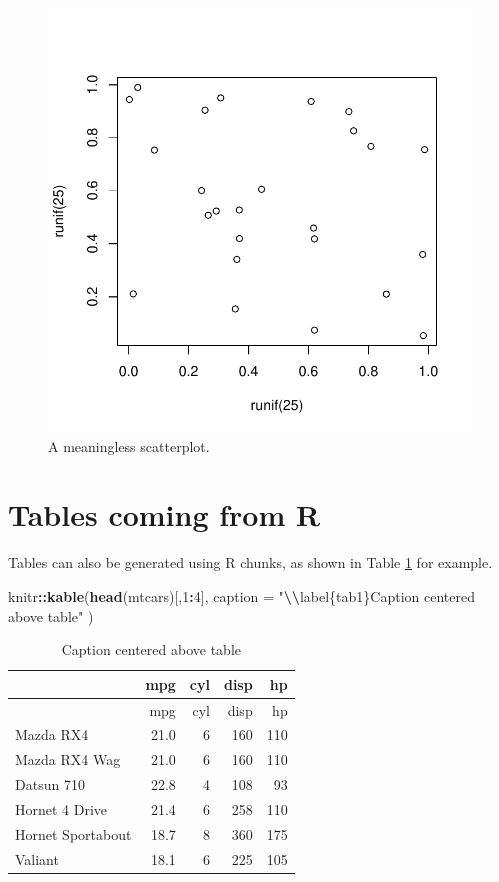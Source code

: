 \documentclass[preprint, 3p,
authoryear]{elsarticle} %
\newenvironment{Shaded}{\begin{snugshade}}{\end{snugshade}}
\newcommand{\AttributeTok}[1]{\textcolor[rgb]{0.13,0.29,0.53}{#1}}
\newcommand{\DecValTok}[1]{\textcolor[rgb]{0.00,0.00,0.81}{#1}}
\newcommand{\FunctionTok}[1]{\textcolor[rgb]{0.13,0.29,0.53}{\textbf{#1}}}
\newcommand{\NormalTok}[1]{#1}
\newcommand{\SpecialCharTok}[1]{\textcolor[rgb]{0.81,0.36,0.00}{\textbf{#1}}}
\newcommand{\StringTok}[1]{\textcolor[rgb]{0.31,0.60,0.02}{#1}}
\begin{document}
\begin{figure}

{\centering \includegraphics[width=0.5\linewidth]{Manuscript_CRKP_files/figure-latex/fig2-1} 

}

\caption{\label{fig2}A meaningless scatterplot.}\label{fig:fig2}
\end{figure}

\section{Tables coming from R}\label{tables-coming-from-r}

Tables can also be generated using R chunks, as shown in Table
\ref{tab1} for example.

\begin{Shaded}
\begin{Highlighting}[]
\NormalTok{knitr}\SpecialCharTok{::}\FunctionTok{kable}\NormalTok{(}\FunctionTok{head}\NormalTok{(mtcars)[,}\DecValTok{1}\SpecialCharTok{:}\DecValTok{4}\NormalTok{], }
    \AttributeTok{caption =} \StringTok{"}\SpecialCharTok{\textbackslash{}\textbackslash{}}\StringTok{label\{tab1\}Caption centered above table"}
\NormalTok{)}
\end{Highlighting}
\end{Shaded}

\begin{longtable}[]{@{}lrrrr@{}}
\caption{\label{tab1}Caption centered above table}\tabularnewline
\toprule\noalign{}
& mpg & cyl & disp & hp \\
\midrule\noalign{}
\endfirsthead
\toprule\noalign{}
& mpg & cyl & disp & hp \\
\midrule\noalign{}
\endhead
\bottomrule\noalign{}
\endlastfoot
Mazda RX4 & 21.0 & 6 & 160 & 110 \\
Mazda RX4 Wag & 21.0 & 6 & 160 & 110 \\
Datsun 710 & 22.8 & 4 & 108 & 93 \\
Hornet 4 Drive & 21.4 & 6 & 258 & 110 \\
Hornet Sportabout & 18.7 & 8 & 360 & 175 \\
Valiant & 18.1 & 6 & 225 & 105 \\
\end{longtable}

\renewcommand\refname{References}

\end{document}
